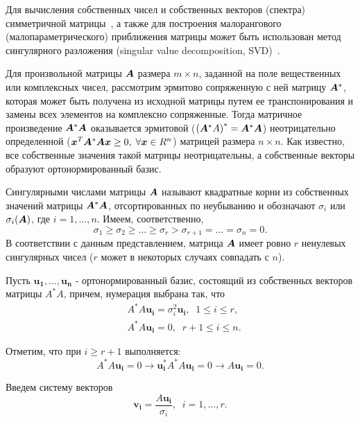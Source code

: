 \documentclass[a4paper,12pt,russian]{article} %
\begin{document}
Для вычисления собственных чисел и собственных векторов (спектра) симметричной матрицы~\cite{tirt_matix}, а также для построения малорангового (малопараметрического) приближения матрицы может быть использован метод сингулярного разложения (singular value decomposition, SVD)~\cite{svd}.
	
Для произвольной матрицы $\bm{A}$ размера $m \times n$, заданной на поле вещественных или комплексных чисел, рассмотрим эрмитово сопряженную с ней матрицу $\bm{A}^*$, которая может быть получена из исходной матрицы путем ее транспонирования и замены всех элементов на комплексно сопряженные. 
Тогда матричное произведение $\bm{A}^* \bm{A}$ оказывается эрмитовой ($ \left( \bm{A}^* A \right) ^* = \bm{A}^* \bm{A}$) неотрицательно определенной ($\bm{x}^T \bm{A}^* \bm{A} \bm{x} \geq 0, \; \forall \bm{x} \in R^{n} $) матрицей размера $n \times n$. 
Как известно, все собственные значения такой матрицы неотрицательны, а собственные векторы образуют ортонормированный базис. 
	
Сингулярными числами матрицы $\bm{A}$ называют квадратные корни из собственных значений матрицы $\bm{A}^* \bm{A}$, отсортированных по неубыванию и обозначают $\sigma_i$ или $\sigma_i(\bm{A})$, где $i=1,\ldots,n$.
Имеем, соответственно,
$$
	\sigma_1 \geq \sigma_2 \geq \ldots \geq \sigma_r > \sigma_{r+1} = \ldots = \sigma_{n} = 0.
$$
В соответствии с данным представлением, матрица $\bm{A}$ имеет ровно $r$ ненулевых сингулярных чисел ($r$ может в некоторых случаях совпадать с $n$).

	Пусть $\bm{u_1}, \ldots, \bm{u_n}$ - ортонормированный базис, состоящий из собственных векторов матрицы $A^*A$, причем, нумерация выбрана так, что
	\begin{equation}\label{SVD_vect}
		\begin{split}
			& A^*A \bm{u_i} = \sigma_i^2 \bm{u_i}, \;\; 1   \leq i \leq r, \\
			& A^*A \bm{u_i} = 0                  , \;\; r+1 \leq i \leq n. 
		\end{split}
	\end{equation}
	
	Отметим, что при $i \geq r+1$ выполняется:
	\begin{equation}\label{SVD_spec}
		A^*A \bm{u_i} = 0 \longrightarrow \bm{u_i^*} A^*A \bm{u_i} = 0 \longrightarrow A \bm{u_i} = 0.
	\end{equation}
	
	Введем систему векторов 
	\begin{equation}\label{SVD_v}
		\bm{v_i}=\frac{A\bm{u_i}}{\sigma_i}, \;\; i=1,\ldots,r.
	\end{equation}
	
\end{document}
